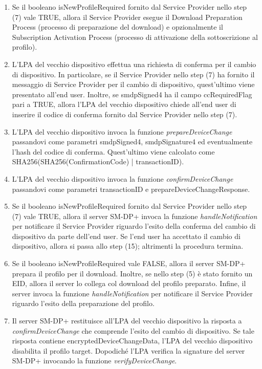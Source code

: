 \documentclass[10pt, twoside, openany]{book}
\begin{document}
\begin{enumerate}
\item Se il booleano isNewProfileRequired fornito dal Service Provider nello step (7) vale TRUE, allora il Service Provider esegue il Download Preparation Process (processo di preparazione del download) e opzionalmente il Subscription Activation Process (processo di attivazione della sottoscrizione al profilo).
\item L'LPA del vecchio dispositivo effettua una richiesta di conferma per il cambio di dispositivo. In particolare, se il Service Provider nello step (7) ha fornito il messaggio di Service Provider per il cambio di dispositivo, quest'ultimo viene presentato all'end user. Inoltre, se smdpSigned4 ha il campo ccRequiredFlag pari a TRUE, allora l'LPA del vecchio dispositivo chiede all'end user di inserire il codice di conferma fornito dal Service Provider nello step (7).
\item L'LPA del vecchio dispositivo invoca la funzione \textit{prepareDeviceChange} passandovi come parametri smdpSigned4, smdpSignature4 ed eventualmente l'hash del codice di conferma. Quest'ultimo viene calcolato come SHA256(SHA256(ConfirmationCode) | transactionID).
\item L'LPA del vecchio dispositivo invoca la funzione \textit{confirmDeviceChange} passandovi come parametri transactionID e prepareDeviceChangeResponse.
\item Se il booleano isNewProfileRequired fornito dal Service Provider nello step (7) vale TRUE, allora il server SM-DP+ invoca la funzione \textit{handleNotification} per notificare il Service Provider riguardo l'esito della conferma del cambio di dispositivo da parte dell'end user. Se l'end user ha accettato il cambio di dispositivo, allora si passa allo step (15); altrimenti la procedura termina.
\item Se il booleano isNewProfileRequired vale FALSE, allora il server SM-DP+ prepara il profilo per il download. Inoltre, se nello step (5) è stato fornito un EID, allora il server lo collega col download del profilo preparato. Infine, il server invoca la funzione \textit{handleNotification} per notificare il Service Provider riguardo l'esito della preparazione del profilo.
\item Il server SM-DP+ restituisce all'LPA del vecchio dispositivo la risposta a \textit{confirmDeviceChange} che comprende l'esito del cambio di dispositivo. Se tale risposta contiene encryptedDeviceChangeData, l'LPA del vecchio dispositivo disabilita il profilo target. Dopodiché l'LPA verifica la signature del server SM-DP+ invocando la funzione \textit{verifyDeviceChange}.

\end{enumerate}
\end{document}
